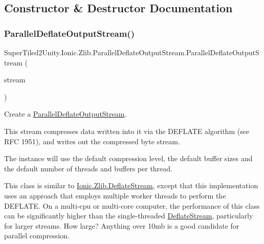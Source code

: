 \subsection{Constructor \& Destructor Documentation}
\mbox{\label{class_super_tiled2_unity_1_1_ionic_1_1_zlib_1_1_parallel_deflate_output_stream_aba84c882116b0dbb99bdc1d939e50b0c}} 
\subsubsection{\texorpdfstring{Parallel\+Deflate\+Output\+Stream()}{ParallelDeflateOutputStream()}\hspace{0.1cm}{\footnotesize\ttfamily [1/5]}}
{\footnotesize\ttfamily Super\+Tiled2\+Unity.\+Ionic.\+Zlib.\+Parallel\+Deflate\+Output\+Stream.\+Parallel\+Deflate\+Output\+Stream (\begin{DoxyParamCaption}\item[{System.\+I\+O.\+Stream}]{stream }\end{DoxyParamCaption})}



Create a \mbox{\hyperlink{class_super_tiled2_unity_1_1_ionic_1_1_zlib_1_1_parallel_deflate_output_stream}{Parallel\+Deflate\+Output\+Stream}}. 

This stream compresses data written into it via the D\+E\+F\+L\+A\+TE algorithm (see R\+FC 1951), and writes out the compressed byte stream. 

The instance will use the default compression level, the default buffer sizes and the default number of threads and buffers per thread. 

This class is similar to \mbox{\hyperlink{class_super_tiled2_unity_1_1_ionic_1_1_zlib_1_1_deflate_stream}{Ionic.\+Zlib.\+Deflate\+Stream}}, except that this implementation uses an approach that employs multiple worker threads to perform the D\+E\+F\+L\+A\+TE. On a multi-\/cpu or multi-\/core computer, the performance of this class can be significantly higher than the single-\/threaded \mbox{\hyperlink{class_super_tiled2_unity_1_1_ionic_1_1_zlib_1_1_deflate_stream}{Deflate\+Stream}}, particularly for larger streams. How large? Anything over 10mb is a good candidate for parallel compression. 

